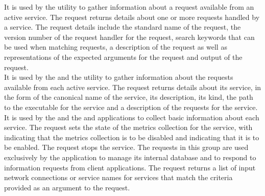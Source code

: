 It is used by the  utility to gather information about a
request available from an active service.
The  request returns details about one or more requests
handled by a service.
The request details include the standard name of the request, the version number of the
request handler for the request, search keywords that can be used when matching requests,
a description of the request as well as representations of the expected arguments for the
request and output of the request.\\

It is used by the  and the
 utility to gather information about the requests available
from each active service.
The  request returns details about its service, in the
form of the canonical name of the service, its description, its kind, the path to the
executable for the service and a description of the requests for the service.\\

It is used by the  and the
 and \emph{\CMU} applications to collect basic information
about each service.
The  request sets the state of the metrics
collection for the service, with  indicating that the metrics collection is
to be disabled and  indicating that it is to be enabled.
The  request stops the service.
\secondaryEnd
{}
The requests in this group are used exclusively by the
 application to manage its internal database and to
respond to information requests from client applications.
The  request returns a list of input \yarp{}
network connections or service names for services that match the criteria provided as an
argument to the request.\\

